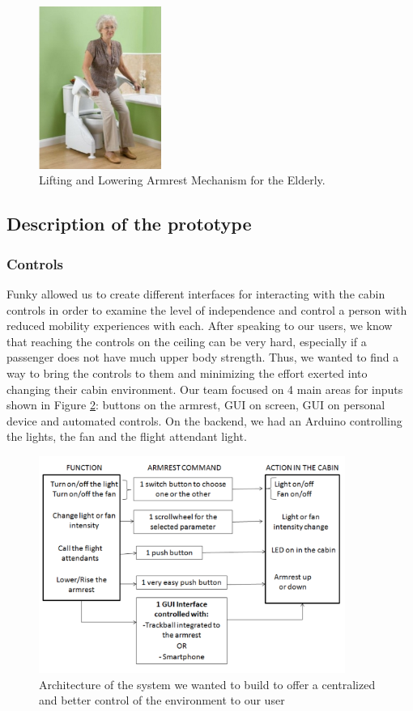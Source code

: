 \begin{figure}[h]
  \centering
     \includegraphics[width=4cm]{images/AssistiveArmrest.jpg}
   \caption{ Lifting and Lowering Armrest Mechanism for the Elderly. \cite{toilet}}
  \label{fig:AssistiveArmrests.jpg}
\end{figure}


\subsection{Description of the prototype}


\subsubsection*{Controls}

Funky allowed us to create different interfaces for interacting with the cabin controls in order to examine the level of independence and control a person with reduced mobility experiences with each. After speaking to our users, we know that reaching the controls on the ceiling can be very hard, especially if a passenger does not have much upper body strength. Thus, we wanted to find a way to bring the controls to them and minimizing the effort exerted into changing their cabin environment.  Our team focused on 4 main areas for inputs shown in Figure \ref{fig:ControlArchitecture.jpg}: buttons on the armrest, GUI on screen, GUI on personal device and automated controls.  On the backend, we had an Arduino controlling the lights, the fan and the flight attendant light. 


\begin{figure}[h]
  \centering
     \includegraphics[width=10cm]{images/ControlArchitecture.jpg}
   \caption{Architecture of the system we wanted to build to offer a centralized and better control of the environment to our user}
  \label{fig:ControlArchitecture.jpg}
\end{figure}

